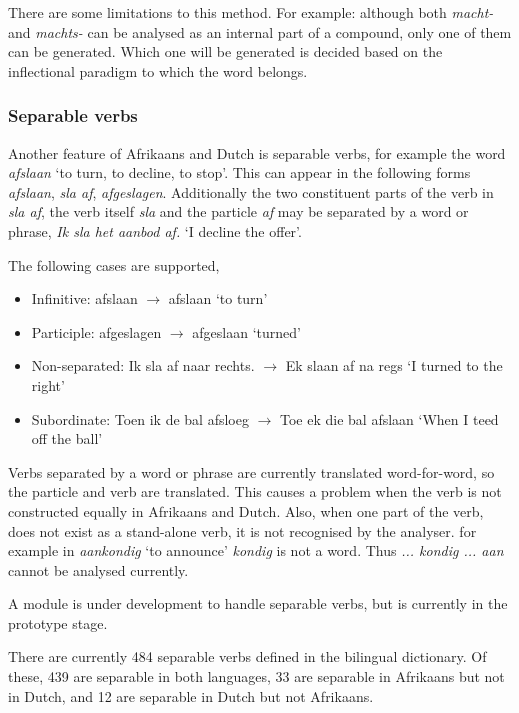 \documentclass[11pt]{article}
\begin{document}
There are some limitations to this method. For example: although
both {\em macht-} and {\em machts-} can be analysed as an internal part
of a compound, only one of them can be generated. Which one will be generated
is decided based on the inflectional paradigm to which the word belongs. %

\subsubsection{Separable verbs}

Another feature of Afrikaans and Dutch is separable verbs, for example
the word {\em afslaan} `to turn, to decline, to stop'. This can appear in the following
forms {\em afslaan}, {\em sla af}, {\em afgeslagen}. Additionally the two constituent
parts of the verb in {\em sla af}, the verb itself {\em sla} and the particle
{\em af} may be separated by a word or phrase, {\em Ik sla het aanbod af.}
 `I decline the offer'.

The following cases are supported,

\begin{itemize}
\item Infinitive: afslaan $\rightarrow$ afslaan `to turn'
\item Participle: afgeslagen $\rightarrow$ afgeslaan `turned'
\item Non-separated: Ik sla af naar rechts. $\rightarrow$ Ek slaan af na regs `I turned to the right' 
\item Subordinate: Toen ik de bal afsloeg $\rightarrow$ Toe ek die bal afslaan `When I teed off the ball'
\end{itemize}

Verbs separated by a word or phrase are currently translated word-for-word,
so the particle and verb are translated. This causes a problem when the
verb is not constructed equally in Afrikaans and Dutch. Also, when one part
of the verb, does not exist as a stand-alone verb, it is not recognised by the analyser.
for example in {\em aankondig} `to announce' {\em kondig} is not a word. Thus {\em ... kondig ... aan} 
cannot be analysed currently.

A module is under development to handle separable verbs, but is currently
in the prototype stage.

There are currently 484 separable verbs defined in the bilingual
dictionary. Of these, 439 are separable in both languages, 33 are
separable in Afrikaans but not in Dutch, and 12 are separable in
Dutch but not Afrikaans.
\end{document}
